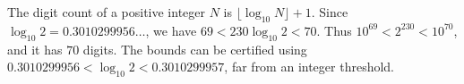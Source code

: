 The digit count of a positive integer $N$ is $\lfloor\log_{10}N\rfloor+1$. Since $\log_{10}2=0.3010299956\ldots$, we have $69<230\log_{10}2<70$. Thus $10^{69}<2^{230}<10^{70}$, and it has $\boxed{70}$ digits. The bounds can be certified using $0.3010299956<\log_{10}2<0.3010299957$, far from an integer threshold.
